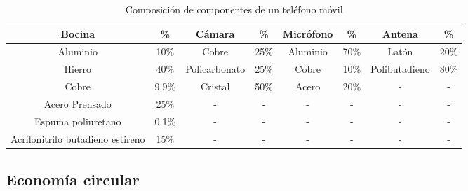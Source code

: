 \documentclass[]{article}
\begin{document}
\begin{table}[ht]
	
	\centering %
	\renewcommand{\arraystretch}{1.5} %
	\begin{tabular}{|c|c|c|c|c|c|c|c|} %
		\hline %
		\textbf{Bocina} & \textbf{\%} & \textbf{Cámara} & \textbf{\%} & \textbf{Micrófono} & \textbf{\%} & \textbf{Antena} & \textbf{\%} \\ %
		\hline %
		Aluminio & 10\% & Cobre  & 25\% & Aluminio  & 70\% & Latón & 20\% \\ %
		\hline %
		Hierro & 40\% & Policarbonato & 25\% & Cobre & 10\% & Polibutadieno & 80\% \\ %
		\hline %
		Cobre & 9.9\% & Cristal & 50\% & Acero & 20\% & - & -  \\ %
		\hline %
		Acero Prensado  & 25\% & - & - & - & - & - & -  \\ %
		\hline %
		Espuma poliuretano & 0.1\% & - & - & - & - & - & - \\ %
		\hline %
		Acrilonitrilo butadieno estireno & 15\% & - & - & - & - & - & - \\ %
		\hline %
	 
	\end{tabular} %
	\caption{Composición de componentes de un teléfono móvil\cite{cruz2017evaluacion}} %
\end{table} %

\subsection{Economía circular}
\end{document}
